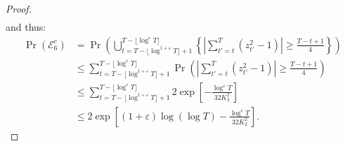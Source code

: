 \begin{proof}
\begin{align*}
\end{align*}
\normalsize
and thus:
\small
\begin{align*}
    \Pr(\mathcal{E}^c_6) &= \Pr\left(\bigcup_{t = T - \lfloor\log^{1+\varepsilon} T\rfloor + 1}^{T - \lfloor\log^{\varepsilon} T\rfloor}  \left\{\left|\sum_{t'=t}^T (z^2_{t'}-1)\right| \geq \frac{T-t+1}{4}\right\} \right) \\
    &\leq \sum_{t = T - \lfloor\log^{1+\varepsilon} T\rfloor + 1}^{T - \lfloor\log^{\varepsilon} T\rfloor}  \Pr\left(\left|\sum_{t'=t}^T (z^2_{t'}-1)\right| \geq \frac{T-t+1}{4}\right) \tag{union bound} \\
    &\leq \sum_{t = T - \lfloor\log^{1+\varepsilon} T\rfloor + 1}^{T - \lfloor\log^{\varepsilon} T\rfloor}   2 \exp\left[-\frac{\log^\varepsilon T}{32K^2_2}\right]  \\
    &\leq2 \exp\left[(1+\varepsilon)\log(\log T)-\frac{\log^\varepsilon T}{32K^2_2}\right]. 
\end{align*}
\normalsize
\end{proof}